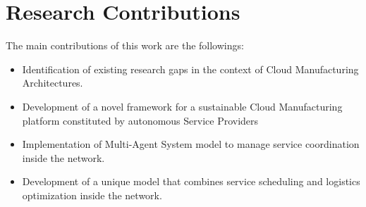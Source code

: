 \section{Research Contributions}
The main contributions of this work are the followings:
\begin{itemize}
    \item Identification of existing research gaps in the context of Cloud Manufacturing Architectures.
    \item Development of a novel framework for a sustainable Cloud Manufacturing platform constituted by autonomous Service Providers
    \item Implementation of Multi-Agent System model to manage service coordination inside the network.
    \item Development of a unique model that combines service scheduling and logistics optimization inside the network.
\end{itemize}
